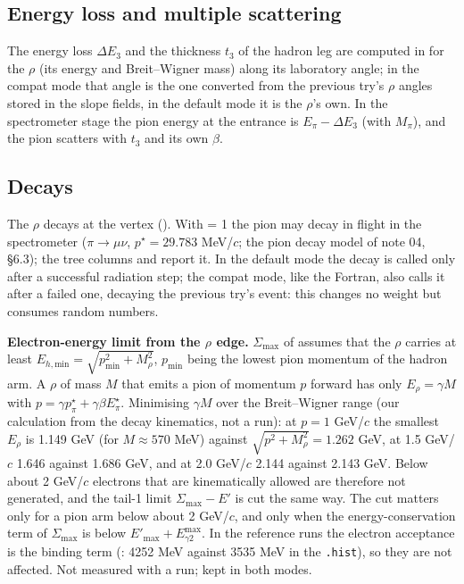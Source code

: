 \documentclass{simcnote}
\begin{document}
\subsection{Energy loss and multiple scattering}
The energy loss $\Delta E_3$ and the thickness $t_3$ of the hadron leg are computed in  for the $\rho$
(its energy and Breit--Wigner mass) along its laboratory angle; in the compat mode that angle is the one converted from
the previous try's $\rho$ angles stored in the slope fields, in the default mode it is the $\rho$'s own. In the
spectrometer stage the pion energy at the entrance is $E_\pi-\Delta E_3$ (with $M_\pi$), and the pion scatters with
$t_3$ and its own $\beta$.

\subsection{Decays}
The $\rho$ decays at the vertex (). With  = 1 the pion may decay in flight in the
spectrometer ($\pi\to\mu\nu$, $p^\star=29.783$ MeV/$c$; the pion decay model of note 04, \S6.3); the tree columns
 and  report it. In the default mode the decay is called only after a successful
radiation step; the compat mode, like the Fortran, also calls it after a failed one, decaying the previous try's
 event: this changes no weight but consumes random numbers.

\begin{simcfindingbox}
\textbf{Electron-energy limit from the $\rho$ edge.} $\Sigma_\mathrm{max}$ of  assumes that the $\rho$
carries at least $E_{h,\mathrm{min}}=\sqrt{p_\mathrm{min}^2+M_\rho^2}$, $p_\mathrm{min}$ being the lowest pion momentum of
the hadron arm. A $\rho$ of mass $M$ that emits a pion of momentum $p$ forward has only $E_\rho=\gamma M$ with
$p=\gamma p^\star_\pi+\gamma\beta E^\star_\pi$. Minimising $\gamma M$ over the Breit--Wigner range (our calculation from
the decay kinematics, not a run): at $p=1$ GeV/$c$ the smallest $E_\rho$ is 1.149 GeV (for $M\approx570$ MeV) against
$\sqrt{p^2+M_\rho^2}=1.262$ GeV, at 1.5 GeV/$c$ 1.646 against 1.686 GeV, and at 2.0 GeV/$c$ 2.144 against 2.143 GeV.
Below about 2 GeV/$c$ electrons that are kinematically allowed are therefore not generated, and the tail-1 limit
$\Sigma_\mathrm{max}-E'$ is cut the same way. The cut matters only for a pion arm below about 2 GeV/$c$, and only when the energy-conservation term of
$\Sigma_\mathrm{max}$ is below $E'_\mathrm{max}+E^\mathrm{max}_{\gamma2}$. In the reference runs the electron acceptance
is the binding term (: 4252 MeV against 3535 MeV in the \texttt{.hist}), so they are not
affected. Not measured with a run; kept in both modes.
\end{simcfindingbox}
\end{document}
